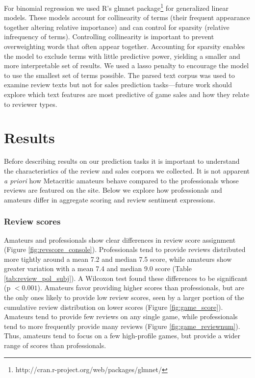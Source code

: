 \documentclass[letterpaper]{article}
\begin{document}
For binomial regression we used R's glmnet package\footnote{http://cran.r-project.org/web/packages/glmnet/} for generalized linear models. These models account for collinearity of terms (their frequent appearance together altering relative importance) and can control for sparsity (relative infrequency of terms). Controlling collinearity is important to prevent overweighting words that often appear together. Accounting for sparsity enables the model to exclude terms with little predictive power, yielding a smaller and more interpretable set of results. We used a lasso penalty to encourage the model to use the smallest set of terms possible. The parsed text corpus was used to examine review texts but not for sales prediction tasks---future work should explore which text features are most predictive of game sales and how they relate to reviewer types.



\section{Results}
Before describing results on our prediction tasks it is important to understand the characteristics of the review and sales corpora we collected. It is not apparent \textit{a priori} how Metacritic amateurs behave compared to the professionals whose reviews are featured on the site. Below we explore how professionals and amateurs differ in aggregate scoring and review sentiment expressions.

\subsubsection{Review scores}
Amateurs and professionals show clear differences in review score assignment (Figure \ref{fig:revscore_console}). Professionals tend to provide reviews distributed more tightly around a mean 7.2 and median 7.5 score, while amateurs show greater variation with a mean 7.4 and median 9.0 score (Table \ref{tab:review_pol_subj}). A Wilcoxon test found these differences to be significant (p $< 0.001$). Amateurs favor providing higher scores than professionals, but are the only ones likely to provide low review scores, seen by a larger portion of the cumulative review distribution on lower scores (Figure \ref{fig:game_score}). Amateurs tend to provide few reviews on any single game, while professionals tend to more frequently provide many reviews (Figure \ref{fig:game_reviewnum}). Thus, amateurs tend to focus on a few high-profile games, but provide a wider range of scores than professionals. 
\end{document}
